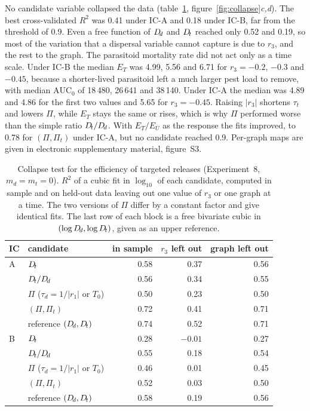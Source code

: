 No candidate variable collapsed the data (table~\ref{tab:collapse}, figure~\ref{fig:collapse}\emph{c,d}). The best cross-validated $R^2$ was 0.41 under IC-A and 0.18 under IC-B, far from the threshold of 0.9. Even a free function of $D_{\!d}$ and $D_{\!t}$ reached only 0.52 and 0.19, so most of the variation that a dispersal variable cannot capture is due to $r_3$, and the rest to the graph. The parasitoid mortality rate did not act only as a time scale. Under IC-B the median $E_T$ was 4.99, 5.56 and 6.71 for $r_3 = -0.2$, $-0.3$ and $-0.45$, because a shorter-lived parasitoid left a much larger pest load to remove, with median $\mathrm{AUC}_0$ of 18\,480, 26\,641 and 38\,140. Under IC-A the median was 4.89 and 4.86 for the first two values and 5.65 for $r_3 = -0.45$. Raising $|r_3|$ shortens $\tau_t$ and lowers $\Pi$, while $E_T$ stays the same or rises, which is why $\Pi$ performed worse than the simple ratio $D_{\!t}/D_{\!d}$. With $E_T/E_U$ as the response the fits improved, to 0.78 for $(\Pi,\Pi_t)$ under IC-A, but no candidate reached 0.9. Per-graph maps are given in electronic supplementary material, figure~S3.

\begin{table}[t]
\centering
\caption{Collapse test for the efficiency of targeted releases (Experiment~8, $m_d = m_t = 0$). $R^2$ of a cubic fit in $\log_{10}$ of each candidate, computed in sample and on held-out data leaving out one value of $r_3$ or one graph at a time. The two versions of $\Pi$ differ by a constant factor and give identical fits. The last row of each block is a free bivariate cubic in $(\log D_{\!d},\log D_{\!t})$, given as an upper reference.}
\label{tab:collapse}
\small
\begin{tabular}{llrrr}
\toprule
IC & candidate & in sample & $r_3$ left out & graph left out\\
\midrule
A & $D_{\!t}$                      & 0.58 & 0.37 & 0.56\\
  & $D_{\!t}/D_{\!d}$                  & 0.56 & 0.34 & 0.55\\
  & $\Pi$ ($\tau_d = 1/|r_1|$ or $T_0$) & 0.50 & 0.23 & 0.50\\
  & $(\Pi, \Pi_t)$             & 0.72 & 0.41 & 0.71\\
  & reference $(D_{\!d}, D_{\!t})$     & 0.74 & 0.52 & 0.71\\
\midrule
B & $D_{\!t}$                      & 0.28 & $-0.01$ & 0.27\\
  & $D_{\!t}/D_{\!d}$                  & 0.55 & 0.18 & 0.54\\
  & $\Pi$ ($\tau_d = 1/|r_1|$ or $T_0$) & 0.46 & 0.01 & 0.45\\
  & $(\Pi, \Pi_t)$             & 0.52 & 0.03 & 0.50\\
  & reference $(D_{\!d}, D_{\!t})$     & 0.58 & 0.19 & 0.56\\
\bottomrule
\end{tabular}
\end{table}

